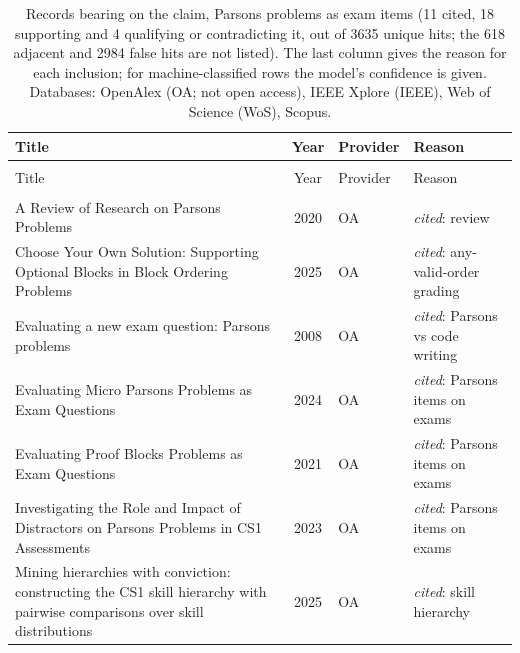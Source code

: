 
\begingroup\footnotesize
\begin{longtable}{@{}%
  >{\raggedright\arraybackslash}p{}c%
  >{\raggedright\arraybackslash}p{}%
  >{\raggedright\arraybackslash}p{}@{}}
\caption{Records bearing on the claim, Parsons problems as exam items (11 cited, 18 supporting and 4 qualifying or contradicting it, out of 3635 unique hits; the 618 adjacent and 2984 false hits are not listed). The last column gives the reason for each inclusion; for machine-classified rows the model's confidence is given. Databases: OpenAlex (OA; not open access), IEEE Xplore (IEEE), Web of Science (WoS), Scopus.}\label{tab:sok-parsons}\\
\toprule
Title & Year & Provider & Reason \\
\midrule
\endfirsthead
\multicolumn{4}{@{}l}{\emph{\tablename~\thetable{} (cont.)}}\\
\toprule
Title & Year & Provider & Reason \\
\midrule
\endhead
\midrule \multicolumn{4}{r@{}}{\emph{continued on next page}}\\
\endfoot
\bottomrule
\endlastfoot
A Review of Research on Parsons Problems & 2020 & OA & \emph{cited}: review \\
Choose Your Own Solution: Supporting Optional Blocks in Block Ordering Problems & 2025 & OA & \emph{cited}: any-valid-order grading \\
Evaluating a new exam question: Parsons problems & 2008 & OA & \emph{cited}: Parsons vs code writing \\
Evaluating Micro Parsons Problems as Exam Questions & 2024 & OA & \emph{cited}: Parsons items on exams \\
Evaluating Proof Blocks Problems as Exam Questions & 2021 & OA & \emph{cited}: Parsons items on exams \\
Investigating the Role and Impact of Distractors on Parsons Problems in CS1 Assessments & 2023 & OA & \emph{cited}: Parsons items on exams \\
Mining hierarchies with conviction: constructing the CS1 skill hierarchy with pairwise comparisons over skill distributions & 2025 & OA & \emph{cited}: skill hierarchy \\

\end{longtable}
